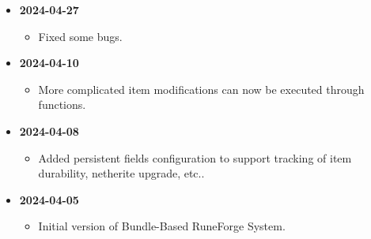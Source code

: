 \documentclass[11pt]{article}
\begin{document}
\begin{itemize}
  \item \textbf{2024-04-27}
    \begin{itemize}
      \item Fixed some bugs.
    \end{itemize}

  \item \textbf{2024-04-10}
    \begin{itemize}
      \item More complicated item modifications can now be executed through functions.
    \end{itemize}

  \item \textbf{2024-04-08}
    \begin{itemize}
      \item Added persistent fields configuration to support tracking of item durability, netherite upgrade, etc..
    \end{itemize}
  
  \item \textbf{2024-04-05}
    \begin{itemize}
      \item Initial version of Bundle-Based RuneForge System.
    \end{itemize}
\end{itemize}
\end{document}
